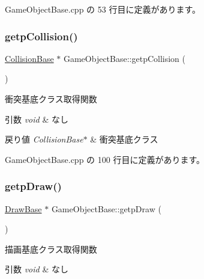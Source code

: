  Game\+Object\+Base.\+cpp の 53 行目に定義があります。

\mbox{\label{class_game_object_base_a40170b972b0a0eb5637edaac211612e2}} 
\subsubsection{\texorpdfstring{getp\+Collision()}{getpCollision()}}
{\footnotesize\ttfamily \mbox{\hyperlink{class_collision_base}{Collision\+Base}} $\ast$ Game\+Object\+Base\+::getp\+Collision (\begin{DoxyParamCaption}{ }\end{DoxyParamCaption})}



衝突基底クラス取得関数 


\begin{DoxyParams}{引数}
{\em void} & なし \\
\hline
\end{DoxyParams}

\begin{DoxyRetVals}{戻り値}
{\em Collision\+Base$\ast$} & 衝突基底クラス \\
\hline
\end{DoxyRetVals}


 Game\+Object\+Base.\+cpp の 100 行目に定義があります。

\mbox{\label{class_game_object_base_a3f75b81c278bef3f58196c58e52aff98}} 
\subsubsection{\texorpdfstring{getp\+Draw()}{getpDraw()}}
{\footnotesize\ttfamily \mbox{\hyperlink{class_draw_base}{Draw\+Base}} $\ast$ Game\+Object\+Base\+::getp\+Draw (\begin{DoxyParamCaption}{ }\end{DoxyParamCaption})}



描画基底クラス取得関数 


\begin{DoxyParams}{引数}
{\em void} & なし \\
\hline
\end{DoxyParams}


